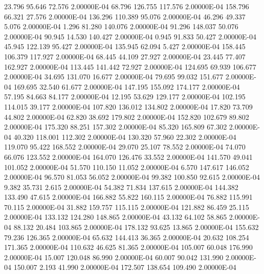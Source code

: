     23.796    95.646    72.576  2.00000E-04
    68.796   126.755   117.576  2.00000E-04
   158.796    66.321    27.576  2.00000E-04
   136.296   110.389    95.076  2.00000E-04
    46.296    49.337     5.076  2.00000E-04
     1.296    81.280   140.076  2.00000E-04
    91.296   148.037    50.076  2.00000E-04
    90.945    14.530   140.427  2.00000E-04
     0.945    91.833    50.427  2.00000E-04
    45.945   122.139    95.427  2.00000E-04
   135.945    62.094     5.427  2.00000E-04
   158.445   106.379   117.927  2.00000E-04
    68.445    44.109    27.927  2.00000E-04
    23.445    77.407   162.927  2.00000E-04
   113.445   141.442    72.927  2.00000E-04
   124.695    69.939   106.677  2.00000E-04
    34.695   131.070    16.677  2.00000E-04
    79.695    99.032   151.677  2.00000E-04
   169.695    32.540    61.677  2.00000E-04
   147.195   155.092   174.177  2.00000E-04
    57.195    84.663    84.177  2.00000E-04
    12.195    53.629   129.177  2.00000E-04
   102.195   114.015    39.177  2.00000E-04
   107.820   136.012   134.802  2.00000E-04
    17.820    73.709    44.802  2.00000E-04
    62.820    38.692   179.802  2.00000E-04
   152.820   102.679    89.802  2.00000E-04
   175.320    88.251   157.302  2.00000E-04
    85.320   165.809    67.302  2.00000E-04
    40.320   118.001   112.302  2.00000E-04
   130.320    57.960    22.302  2.00000E-04
   119.070    95.422   168.552  2.00000E-04
    29.070    25.107    78.552  2.00000E-04
    74.070    66.076   123.552  2.00000E-04
   164.070   126.476    33.552  2.00000E-04
   141.570    49.041   101.052  2.00000E-04
    51.570   110.150    11.052  2.00000E-04
     6.570   147.617   146.052  2.00000E-04
    96.570    81.053    56.052  2.00000E-04
    99.382   100.850    92.615  2.00000E-04
     9.382    35.731     2.615  2.00000E-04
    54.382    71.834   137.615  2.00000E-04
   144.382   133.490    47.615  2.00000E-04
   166.882    55.822   160.115  2.00000E-04
    76.882   115.991    70.115  2.00000E-04
    31.882   159.757   115.115  2.00000E-04
   121.882    86.459    25.115  2.00000E-04
   133.132   124.280   148.865  2.00000E-04
    43.132    64.102    58.865  2.00000E-04
    88.132    20.484   103.865  2.00000E-04
   178.132    93.625    13.865  2.00000E-04
   155.632    79.236   126.365  2.00000E-04
    65.632   144.413    36.365  2.00000E-04
    20.632   108.254   171.365  2.00000E-04
   110.632    46.625    81.365  2.00000E-04
   105.007    60.048   176.990  2.00000E-04
    15.007   120.048    86.990  2.00000E-04
    60.007    90.042   131.990  2.00000E-04
   150.007     2.193    41.990  2.00000E-04
   172.507   138.654   109.490  2.00000E-04
